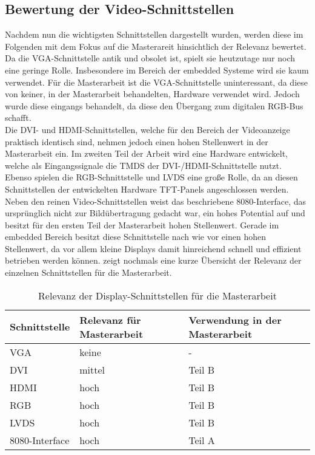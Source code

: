 \subsection{Bewertung der Video-Schnittstellen}
\label{cha:bewertung_video}
Nachdem nun die wichtigsten Schnittstellen dargestellt wurden, werden diese im Folgenden mit dem Fokus auf die Masterareit hinsichtlich der Relevanz bewertet.
Da die VGA-Schnittstelle antik und obsolet ist, spielt sie heutzutage nur noch eine geringe Rolle. Insbesondere im Bereich der embedded Systeme wird sie kaum verwendet. Für die Masterarbeit ist die VGA-Schnittstelle uninteressant, da diese von keiner, in der Masterarbeit behandelten, Hardware verwendet wird. Jedoch wurde diese eingangs behandelt, da diese den Übergang zum digitalen RGB-Bus schafft.\\
Die DVI- und HDMI-Schnittstellen, welche für den Bereich der Videoanzeige praktisch identisch sind, nehmen jedoch einen hohen Stellenwert in der Masterarbeit ein. Im zweiten Teil der Arbeit wird eine Hardware entwickelt, welche als Eingangssignale die TMDS der DVI-/HDMI-Schnittstelle nutzt. 
Ebenso spielen die RGB-Schnittstelle und LVDS eine große Rolle, da an diesen Schnittstellen der entwickelten Hardware TFT-Panels angeschlossen werden. \\
Neben den reinen Video-Schnittstellen weist das beschriebene 8080-Interface, das ursprünglich nicht zur Bildübertragung gedacht war, ein hohes Potential auf und besitzt für den ersten Teil der Masterarbeit hohen Stellenwert. Gerade im embedded Bereich besitzt diese Schnittstelle nach wie vor einen hohen Stellenwert, da vor allem kleine Displays damit hinreichend schnell und effizient betrieben werden können.  zeigt nochmals eine kurze Übersicht der Relevanz der einzelnen Schnittstellen für die Masterarbeit.

\begin{table}[h]
\begin{tabular}{|p{3cm}|p{5cm}|p{4.5cm}|}\hline
\rowcolor{TableBackgroundColor}
   \textbf{Schnittstelle} 	& \textbf{Relevanz für Masterarbeit} 	& \textbf{Verwendung in der Masterarbeit}	\\ \hline
   VGA 						& keine  								& - 	 									\\ \hline
   DVI 						& mittel 								& Teil B 									\\ \hline
   HDMI						& hoch 									& Teil B 									\\ \hline
   RGB 						& hoch 									& Teil B 									\\ \hline
   LVDS 					& hoch									& Teil B 									\\ \hline
   8080-Interface 			& hoch 									& Teil A 									\\ \hline
\end{tabular}
\caption{Relevanz der Display-Schnittstellen für die Masterarbeit}
\label{tab:interface_vergleich}
\end{table}

